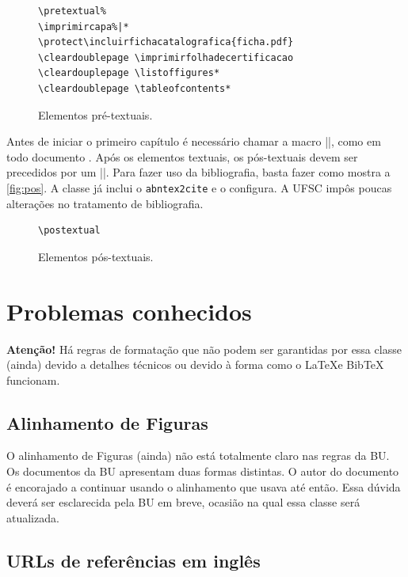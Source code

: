 \documentclass[embeddedlogo]{../ufsc-thesis-rn46-2019}
\begin{document}
\begin{figure}[tb]
  \centering
  \caption{Elementos pré-textuais.}
  \label{fig:pre}
  \begin{verbatim}
\pretextual%
\imprimircapa%|*
\protect\incluirfichacatalografica{ficha.pdf}
\cleardoublepage \imprimirfolhadecertificacao
\cleardouplepage \listoffigures*
\cleardoublepage \tableofcontents*
  \end{verbatim}
\end{figure}

Antes de iniciar o primeiro capítulo é necessário chamar a macro \mt|\textual|,
como em todo documento \abnTeX. Após os elementos textuais, os pós-textuais
devem ser precedidos por um \mt|\postextual|. Para fazer uso da bibliografia,
basta fazer como mostra a \autoref{fig:pos}. A classe já inclui o
\texttt{abntex2cite} e o configura. A UFSC impôs poucas alterações no
tratamento de bibliografia.

\begin{figure}[tb]
  \centering
  \caption{Elementos pós-textuais.}
  \label{fig:pos}
  \begin{verbatim}
\postextual

  \end{verbatim}
\end{figure}


\chapter{Problemas conhecidos}
\label{ch:problems}

\textbf{Atenção!} Há regras de formatação que não podem ser garantidas por essa
classe (ainda) devido a detalhes técnicos ou devido à forma como o \LaTeX e
BibTeX funcionam.

\section{Alinhamento de Figuras}
O alinhamento de Figuras (ainda) não está totalmente claro nas regras da BU. Os
documentos da BU apresentam duas formas distintas. O autor do documento é
encorajado a continuar usando o alinhamento que usava até então. Essa dúvida
deverá ser esclarecida pela BU em breve, ocasião na qual essa classe será
atualizada.

\section{URLs de referências em inglês}
\end{document}
